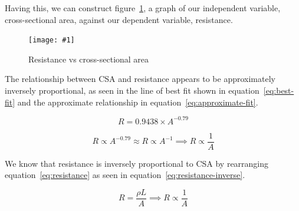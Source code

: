 \documentclass{article}
\newcommand{\unc}[2]{\(\pm\SI{#1}{#2}\)}
\newcommand{\punc}[2]{\(\pm\SI{#1}{\percent}\) \si{#2}}
\newcommand{\graph}[2]{
  \begin{figure}[H]
    \medskip
    \centering
    \texttt{[image: \#1]}
    \caption{#2}\label{fig:#1}
  \end{figure}
}
\begin{document}


Having this, we can construct figure~\ref{fig:resistance-vs-csa}, a graph of our independent variable, cross-sectional area, against our dependent variable, resistance.

\graph{resistance-vs-csa}{Resistance vs cross-sectional area}

The relationship between CSA and resistance appears to be approximately inversely proportional, as seen in the line of best fit shown in equation~\ref{eq:best-fit} and the approximate relationship in equation~\ref{eq:approximate-fit}.

\begin{equation}\label{eq:best-fit}
  R = 0.9438 \times A^{-0.79}
\end{equation}

\begin{equation}\label{eq:approximate-fit}
  R \propto A^{-0.79} \approx R \propto A^{-1} \implies R \propto \frac{1}{A}
\end{equation}

We know that resistance is inversely proportional to CSA by rearranging equation~\ref{eq:resistance} as seen in equation~\ref{eq:resistance-inverse}.

\begin{equation}\label{eq:resistance-inverse}
  R = \frac{\rho L}{A} \implies R \propto \frac{1}{A}
\end{equation}
\end{document}
